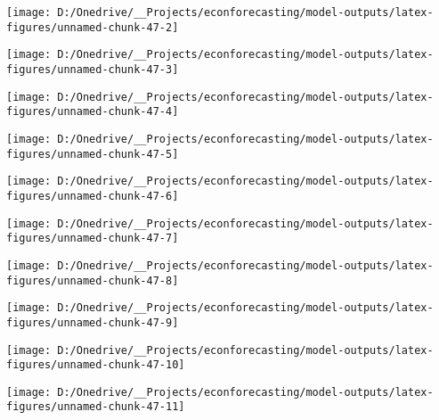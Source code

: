 \documentclass[11pt, letterpaper]{article}\usepackage[]{graphicx}\usepackage[]{color}
\begin{document}
{\centering \texttt{[image: D:/Onedrive/\_\_Projects/econforecasting/model-outputs/latex-figures/unnamed-chunk-47-2]} 

}




{\centering \texttt{[image: D:/Onedrive/\_\_Projects/econforecasting/model-outputs/latex-figures/unnamed-chunk-47-3]} 

}




{\centering \texttt{[image: D:/Onedrive/\_\_Projects/econforecasting/model-outputs/latex-figures/unnamed-chunk-47-4]} 

}




{\centering \texttt{[image: D:/Onedrive/\_\_Projects/econforecasting/model-outputs/latex-figures/unnamed-chunk-47-5]} 

}




{\centering \texttt{[image: D:/Onedrive/\_\_Projects/econforecasting/model-outputs/latex-figures/unnamed-chunk-47-6]} 

}




{\centering \texttt{[image: D:/Onedrive/\_\_Projects/econforecasting/model-outputs/latex-figures/unnamed-chunk-47-7]} 

}




{\centering \texttt{[image: D:/Onedrive/\_\_Projects/econforecasting/model-outputs/latex-figures/unnamed-chunk-47-8]} 

}




{\centering \texttt{[image: D:/Onedrive/\_\_Projects/econforecasting/model-outputs/latex-figures/unnamed-chunk-47-9]} 

}




{\centering \texttt{[image: D:/Onedrive/\_\_Projects/econforecasting/model-outputs/latex-figures/unnamed-chunk-47-10]} 

}




{\centering \texttt{[image: D:/Onedrive/\_\_Projects/econforecasting/model-outputs/latex-figures/unnamed-chunk-47-11]} 

}
\end{document}
